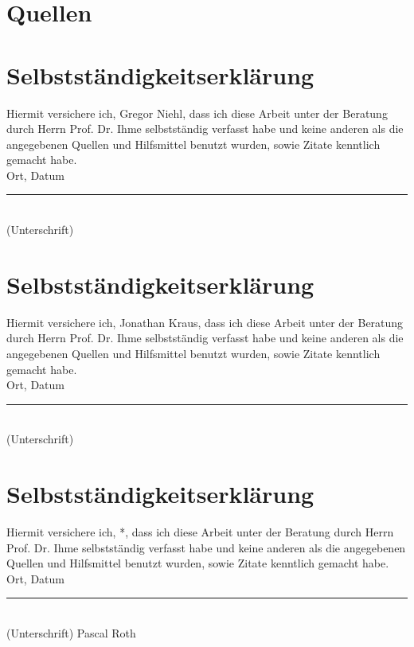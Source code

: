 
\section*{Quellen}
\bib
\appendix

\newcommand{\selbststaendigkeitserklaerung}[1]{
	\newpage
	\section*{Selbstständigkeitserklärung}
	Hiermit versichere ich, {#1}, dass ich diese Arbeit unter der Beratung durch Herrn Prof. Dr. Ihme selbstständig verfasst habe und keine anderen als die angegebenen Quellen und Hilfsmittel benutzt wurden, sowie Zitate kenntlich gemacht habe. \\[2cm]

	Ort, Datum \hfill \rule{5cm}{0.4pt} \\
	\hfill (Unterschrift)
}

\selbststaendigkeitserklaerung{Gregor Niehl}
\selbststaendigkeitserklaerung{Jonathan Kraus}
\selbststaendigkeitserklaerung*{Pascal Roth}
